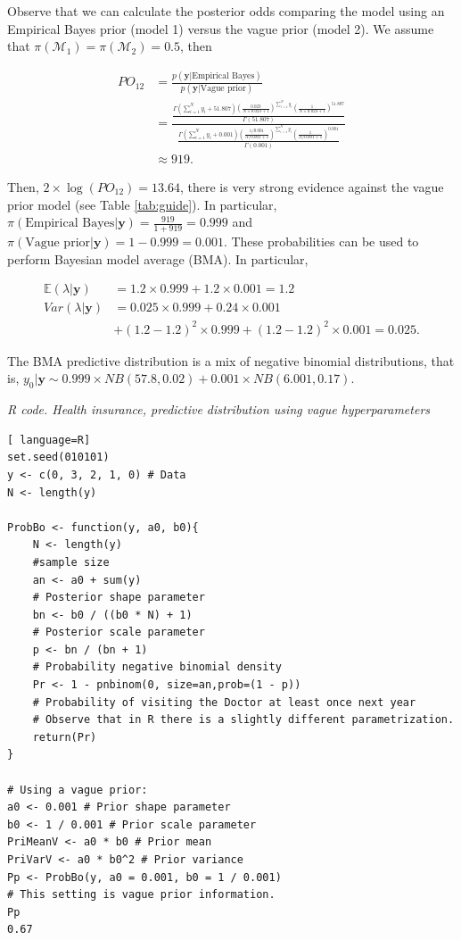 Observe that we can calculate the posterior odds comparing the model using an Empirical Bayes prior (model 1) versus the vague prior (model 2). We assume that $\pi(\mathcal{M}_1)=\pi(\mathcal{M}_2)=0.5$, then

\begin{align*}
	PO_{12}&=\frac{p(\mathbf{y}|\text{Empirical Bayes})}{p(\mathbf{y}|\text{Vague prior})}\\
	&=\frac{\frac{\Gamma(\sum_{i=1}^N y_i+51.807)\left(\frac{0.023}{N\times 0.023+1}\right)^{\sum_{i=1}^N y_i}\left(\frac{1}{N\times 0.023+1}\right)^{51.807}}{\Gamma(51.807)}}{\frac{\Gamma(\sum_{i=1}^N y_i+0.001)\left(\frac{1/0.001}{N/0.001+1}\right)^{\sum_{i=1}^N y_i}\left(\frac{1}{N/0.001+1}\right)^{0.001}}{\Gamma(0.001)}}\\
	&\approx 919.
\end{align*}

Then, $2\times \log(PO_{12})=13.64$, there is very strong evidence against the vague prior model (see Table \ref{tab:guide}). In particular, $\pi(\text{Empirical Bayes}|\mathbf{y})=\frac{919}{1+919}=0.999$ and $\pi(\text{Vague prior}|\mathbf{y})=1-0.999=0.001$. These probabilities can be used to perform Bayesian model average (BMA). In particular,

\begin{align*}
	\mathbb{E}(\lambda|\mathbf{y})&=1.2\times 0.999+1.2\times 0.001=1.2\\
	Var(\lambda|\mathbf{y})&=0.025\times 0.999+0.24\times 0.001\\
	& + (1.2-1.2)^2\times 0.999 + (1.2-1.2)^2\times 0.001= 0.025.
\end{align*}

The BMA predictive distribution is a mix of negative binomial distributions, that is, $y_0|\mathbf{y}\sim 0.999\times NB(57.8, 0.02)+0.001\times NB(6.001, 0.17)$.

\begin{tcolorbox}[enhanced,width=4.67in,center upper,
	fontupper=\large\bfseries,drop shadow southwest,sharp corners]
\textit{R code. Health insurance, predictive distribution using vague hyperparameters}
\begin{VF}
\begin{lstlisting}[ language=R]
set.seed(010101)
y <- c(0, 3, 2, 1, 0) # Data
N <- length(y)

ProbBo <- function(y, a0, b0){
	N <- length(y)
	#sample size
	an <- a0 + sum(y) 
	# Posterior shape parameter
	bn <- b0 / ((b0 * N) + 1) 
	# Posterior scale parameter
	p <- bn / (bn + 1) 
	# Probability negative binomial density
	Pr <- 1 - pnbinom(0, size=an,prob=(1 - p)) 
	# Probability of visiting the Doctor at least once next year
	# Observe that in R there is a slightly different parametrization.
	return(Pr)
} 

# Using a vague prior:
a0 <- 0.001 # Prior shape parameter
b0 <- 1 / 0.001 # Prior scale parameter
PriMeanV <- a0 * b0 # Prior mean
PriVarV <- a0 * b0^2 # Prior variance
Pp <- ProbBo(y, a0 = 0.001, b0 = 1 / 0.001) 
# This setting is vague prior information.
Pp
0.67
\end{lstlisting}
\end{VF}
\end{tcolorbox} 

